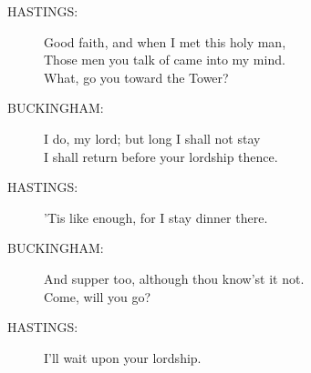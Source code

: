 \documentclass{article}
\begin{document}
\begin{description}
\item[HASTINGS:] 
\hspace{1pt}Good faith, and when I met this holy man,\\
\hspace{1pt}Those men you talk of came into my mind.\\
\hspace{1pt}What, go you toward the Tower?\\
\end{description}
\begin{description}
\item[BUCKINGHAM:] 
\hspace{1pt}I do, my lord; but long I shall not stay\\
\hspace{1pt}I shall return before your lordship thence.\\
\end{description}
\begin{description}
\item[HASTINGS:] 
\hspace{1pt}'Tis like enough, for I stay dinner there.\\
\end{description}
\begin{description}
\item[BUCKINGHAM:] 
\hspace{1pt}  And supper too, although thou know'st it not.\\
\hspace{1pt}Come, will you go?\\
\end{description}
\begin{description}
\item[HASTINGS:] 
\hspace{1pt}I'll wait upon your lordship.\\
\end{description}
\centering{\it [Exeunt]}\\
\end{document}
